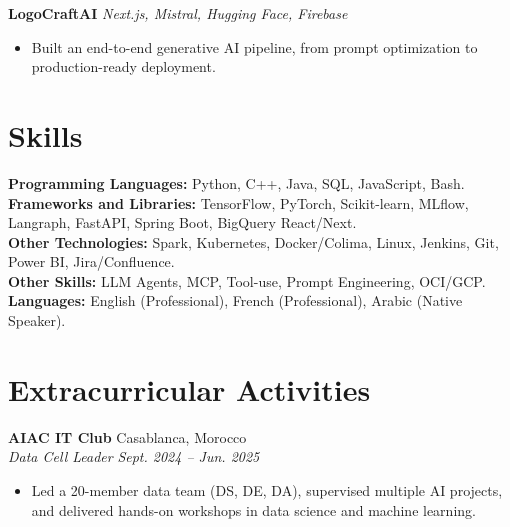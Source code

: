 \documentclass[11pt,a4paper]{article}
\newcommand{\resumeItem}[1]{\item\small{#1}}
\newcommand{\resumeSubheading}[4]{
  \vspace{1pt}
  \noindent\textbf{#1} \hfill #2 \\
  \textit{#3} \hfill \textit{#4}
  \vspace{0pt}
}
\newcommand{\resumeProjectHeading}[2]{
  \vspace{1pt}
  \noindent\textbf{#1} \hfill \textit{#2}
  \vspace{0pt}
}
\begin{document}
\resumeProjectHeading
{LogoCraftAI}{Next.js, Mistral, Hugging Face, Firebase}
\begin{itemize}
    \resumeItem{Built an end-to-end generative AI pipeline, from prompt optimization to production-ready deployment.}
\end{itemize}

\vspace{-5pt}

\section{Skills}


\hspace{-12pt}\textbf{Programming Languages:} Python, C++, Java, SQL, JavaScript, Bash. \\
\vspace{1pt}
\textbf{Frameworks and Libraries:} TensorFlow, PyTorch, Scikit-learn, MLflow, Langraph, FastAPI, Spring Boot, BigQuery React/Next. \\
\vspace{1pt}
\textbf{Other Technologies:} Spark, Kubernetes, Docker/Colima, Linux, Jenkins, Git, Power BI, Jira/Confluence. \\
\vspace{1pt}
\textbf{Other Skills:}  LLM Agents, MCP, Tool-use, Prompt Engineering, OCI/GCP. \\
\vspace{1pt}
\textbf{Languages:} English (Professional), French (Professional), Arabic (Native Speaker).

\section{Extracurricular Activities}

\resumeSubheading
{AIAC IT Club}{Casablanca, Morocco}
{Data Cell Leader}{Sept. 2024 -- Jun. 2025}
\begin{itemize}
    \resumeItem{Led a 20-member data team (DS, DE, DA), supervised multiple AI projects, and delivered hands-on workshops in data science and machine learning.}
\end{itemize}
\end{document}
